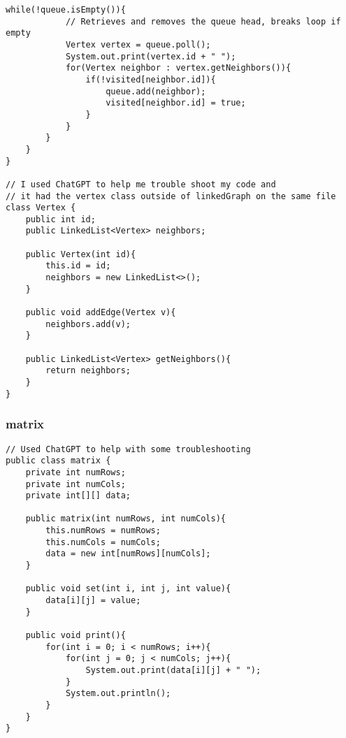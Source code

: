 \documentclass[10pt]{article}
\begin{document}
\begin{lstlisting}[frame=single, ]
        while(!queue.isEmpty()){
            // Retrieves and removes the queue head, breaks loop if empty
            Vertex vertex = queue.poll();
            System.out.print(vertex.id + " ");
            for(Vertex neighbor : vertex.getNeighbors()){
                if(!visited[neighbor.id]){
                    queue.add(neighbor);
                    visited[neighbor.id] = true;
                }
            }
        }
    }
}

// I used ChatGPT to help me trouble shoot my code and 
// it had the vertex class outside of linkedGraph on the same file
class Vertex {
    public int id;
    public LinkedList<Vertex> neighbors;

    public Vertex(int id){
        this.id = id;
        neighbors = new LinkedList<>();
    }

    public void addEdge(Vertex v){
        neighbors.add(v);
    }

    public LinkedList<Vertex> getNeighbors(){
        return neighbors;
    }
}
\end{lstlisting}

\subsubsection{matrix}
\lstset{numbers=left, numberstyle=\tiny, stepnumber=1, numbersep=5pt, basicstyle=\footnotesize\ttfamily}
\begin{lstlisting}[frame=single, ]  
// Used ChatGPT to help with some troubleshooting
public class matrix {
    private int numRows;
    private int numCols;
    private int[][] data;
    
    public matrix(int numRows, int numCols){
        this.numRows = numRows;
        this.numCols = numCols;
        data = new int[numRows][numCols];
    }
    
    public void set(int i, int j, int value){
        data[i][j] = value;
    }
    
    public void print(){
        for(int i = 0; i < numRows; i++){
            for(int j = 0; j < numCols; j++){
                System.out.print(data[i][j] + " ");
            }
            System.out.println();
        }
    }
}
\end{lstlisting}
\end{document}
